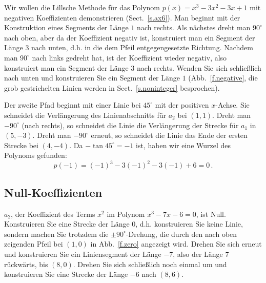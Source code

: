 Wir wollen die Lillsche Methode für das Polynom $p(x)=x^3-3x^2-3x+1$ mit negativen Koeffizienten demonstrieren (Sect.~\ref{s.ax6}). Man beginnt mit der Konstruktion eines Segments der Länge $1$ nach rechts. Als nächstes dreht man $90^\circ$ nach oben, aber da der Koeffizient negativ ist, konstruiert man ein Segment der Länge $3$ nach unten, d.h. in die dem Pfeil entgegengesetzte Richtung. Nachdem man $90^\circ$ nach links gedreht hat, ist der Koeffizient wieder negativ, also konstruiert man ein Segment der Länge $3$ nach rechts. Wenden Sie sich schließlich nach unten und konstruieren Sie ein Segment der Länge $1$ (Abb.~\ref{f.negative}, die grob gestrichelten Linien werden in Sect.~\ref{s.noninteger} besprochen).

Der zweite Pfad beginnt mit einer Linie bei $45^\circ$ mit der positiven $x$-Achse. Sie schneidet die Verlängerung des Linienabschnitts für $a_2$ bei $(1,1)$. Dreht man $-90^\circ$ (nach rechts), so schneidet die Linie die Verlängerung der Strecke für $a_1$ in $(5,-3)$. Dreht man $-90^\circ$ erneut, so schneidet die Linie das Ende der ersten Strecke bei $(4,-4)$. Da $-\tan 45^\circ=-1$ ist, haben wir eine Wurzel des Polynoms gefunden:
\[p(-1)=(-1)^3-3(-1)^2-3(-1)+6=0\,.\]

\subsection{Null-Koeffizienten}\label{s.zero}

$a_2$, der Koeffizient des Terms $x^2$ im Polynom $x^3-7x-6=0$, ist Null. Konstruieren Sie eine Strecke der Länge $0$, d.h. konstruieren Sie keine Linie, sondern machen Sie trotzdem die $\pm 90^\circ$-Drehung, die durch den nach oben zeigenden Pfeil bei $(1,0)$ in Abb.~\ref{f.zero} angezeigt wird. Drehen Sie sich erneut und konstruieren Sie ein Liniensegment der Länge $-7$, also der Länge $7$ rückwärts, bis $(8,0)$. Drehen Sie sich schließlich noch einmal um und konstruieren Sie eine Strecke der Länge $-6$ nach $(8,6)$.

